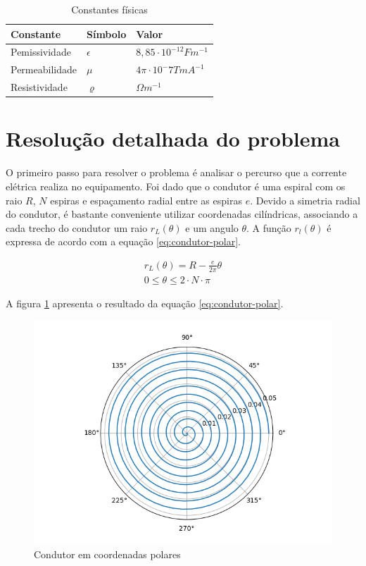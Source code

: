 \documentclass[
	article,			%
	11pt,				%
	oneside,			%
	a4paper,			%
	english,			%
	brazil,				%
	sumario=tradicional
	]{abntex2}
\begin{document}
\begin{table}[h]
	\begin{tabular}{@{}lll@{}}
		\toprule
		Constante      & Símbolo      & Valor \\ \midrule
		Pemissividade  & $ \epsilon $ & $ 8,85 \cdot 10^{-12} F m^{-1} $ \\
		Permeabilidade & $ \mu $      & $ 4\pi \cdot 10^-7 T m A^{-1}  $ \\
		Resistividade  & $ \varrho $     & $ \Omega m^{-1} $             \\ \bottomrule
	\end{tabular}
	\caption{Constantes físicas}
	\label{tab:constantes}
\end{table}

\section{Resolução detalhada do problema}

O primeiro passo para resolver o problema é analisar o percurso que a corrente elétrica realiza no equipamento. Foi dado que o condutor é uma espiral com os raio $ R $, $ N $ espiras e espaçamento radial entre as espiras $ e $. Devido a simetria radial do condutor, é bastante conveniente utilizar coordenadas cilíndricas, associando a cada trecho do condutor um raio $ r_L(\theta) $ e um angulo $ \theta $. A função $ r_l(\theta) $ é expressa de acordo com a equação \ref{eq:condutor-polar}.

\begin{equation} \label{eq:condutor-polar}
	\begin{array}{l}
		r_L(\theta) = R - \frac{e}{2\pi} \theta \\
		0 \le \theta \le 2\cdot N \cdot \pi
	\end{array}
\end{equation}

A figura \ref{fig:condutor-polar} apresenta o resultado da equação \ref{eq:condutor-polar}.

\begin{figure}[h]
	\centering
	\includegraphics[width=0.7\linewidth]{figures/espirapolar}
	\caption[Condutor em coordenadas polares]{Condutor em coordenadas polares}
	\label{fig:condutor-polar}
\end{figure}
\end{document}
